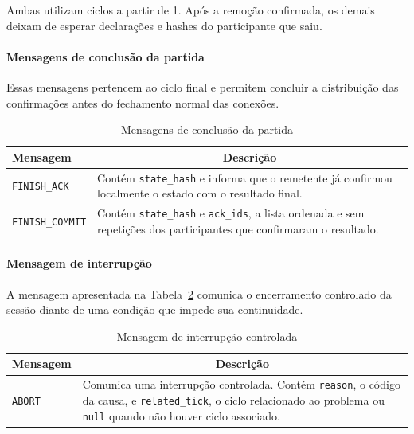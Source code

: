 \documentclass[11pt,a4paper]{article}
\begin{document}
Ambas utilizam ciclos a partir de 1. Após a remoção confirmada, os demais deixam de esperar declarações e hashes do participante que saiu.

\paragraph{Mensagens de conclusão da partida}

Essas mensagens pertencem ao ciclo final e permitem concluir a distribuição das confirmações antes do fechamento normal das conexões.

\begin{table}[H]
    \centering
    \caption{Mensagens de conclusão da partida}
    \label{tab:conclusao_p2p}
    \begin{tabular}{|p{3.5cm}|p{10cm}|}
        \hline
        \textbf{Mensagem} &
        \multicolumn{1}{c|}{\textbf{Descrição}} \\ \hline

        \texttt{FINISH\_ACK} &
        Contém \texttt{state\_hash} e informa que o remetente já confirmou localmente o estado com o resultado final. \\ \hline

        \texttt{FINISH\_COMMIT} &
        Contém \texttt{state\_hash} e \texttt{ack\_ids}, a lista ordenada e sem repetições dos participantes que confirmaram o resultado. \\ \hline
    \end{tabular}
\end{table}


\paragraph{Mensagem de interrupção}

A mensagem apresentada na Tabela~\ref{tab:interrupcao_p2p} comunica o encerramento controlado da sessão diante de uma condição que impede sua continuidade.

\begin{table}[H]
    \centering
    \caption{Mensagem de interrupção controlada}
    \label{tab:interrupcao_p2p}
    \begin{tabular}{|p{3.5cm}|p{10cm}|}
        \hline
        \textbf{Mensagem} &
        \multicolumn{1}{c|}{\textbf{Descrição}} \\ \hline

        \texttt{ABORT} &
        Comunica uma interrupção controlada. Contém \texttt{reason}, o código da causa, e \texttt{related\_tick}, o ciclo relacionado ao problema ou \texttt{null} quando não houver ciclo associado. \\ \hline
    \end{tabular}
\end{table}
\end{document}
